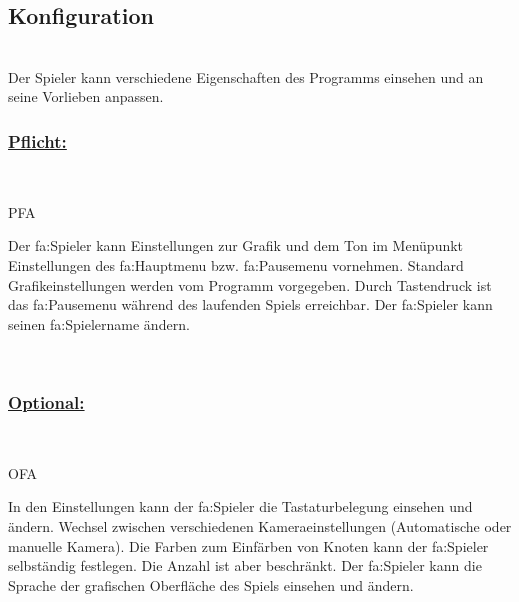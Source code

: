 %
%


\subsection{Konfiguration}

%
%
\renewcommand{\K}{}
%
%

~\\
Der Spieler kann verschiedene Eigenschaften des Programms einsehen und an seine Vorlieben anpassen.
\\

%
%
\subsubsection*{\underline{Pflicht:}}~\\

\begin{ids}{\gls{PFA\K}}

	\id[ 10] Der \gls{fa:Spieler} kann Einstellungen zur Grafik und dem Ton im Menüpunkt Einstellungen des \gls{fa:Hauptmenu} bzw. \gls{fa:Pausemenu} vornehmen.
 	\id[ 20] Standard Grafikeinstellungen werden vom Programm vorgegeben.
 	\id[ 30] Durch Tastendruck ist das \gls{fa:Pausemenu} während des laufenden Spiels erreichbar.
 	\id[ 40] Der \gls{fa:Spieler} kann seinen \gls{fa:Spielername} ändern.
 	
 	
	
\end{ids}

~\\


%
%
\subsubsection*{\underline{Optional:}}~\\


\begin{ids}{\gls{OFA\K}}

	\id[ 50] In den Einstellungen kann der \gls{fa:Spieler} die Tastaturbelegung einsehen und  ändern.
 	\id[60] Wechsel zwischen verschiedenen Kameraeinstellungen (Automatische oder manuelle Kamera).
 	\id[ 70] Die Farben zum Einfärben von \gls{Knoten} kann der \gls{fa:Spieler} selbständig festlegen. Die Anzahl ist aber beschränkt.
 	\id[ 80] Der \gls{fa:Spieler} kann die Sprache der grafischen Oberfläche des Spiels einsehen und ändern.
 	
 	
	
\end{ids}

~\\
